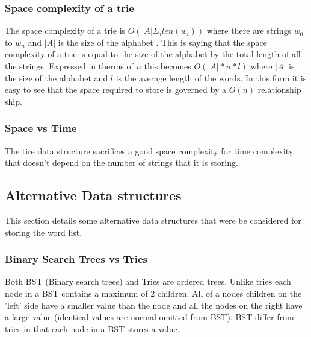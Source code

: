 \documentclass[10pt]{article} %
\begin{document}
			\subsubsection{Space complexity of a trie}
			    The space complexity of a trie is \begin{math} O(\vert A \vert \Sigma_i len(w_i))\end{math} where there are strings \begin{math} w_0 \end{math} to \begin{math} w_n \end{math} and \begin{math}\vert A \vert \end{math} is the size of the alphabet \cite{book:ADS:complexity}.
			    This is saying that the space complexity of a trie is equal to the size of the alphabet by the total length of all the strings.
			    Expressed in therms of \begin{math} n \end{math} this becomes \begin{math} O(\vert A \vert * n * l )\end{math} where \begin{math}\vert A \vert \end{math} is the size of the alphabet and \begin{math} l \end{math} is the average length of the words.
			    In this form it is easy to see that the space required to store is governed by a  \begin{math} O(n) \end{math} relationship ship.
			    
            \subsubsection{Space vs Time}
                The tire data structure sacrifices a good space complexity for time complexity that doesn't depend on the number of strings that it is storing. 
                
		\subsection{Alternative Data structures}
		    This section details some alternative data structures that were be considered for storing the word list.
		    
			\subsubsection{Binary Search Trees vs Tries}
			    Both BST (Binary search trees) and Tries are ordered trees.
			    Unlike tries each node in a BST contains a maximum of 2 children. All of a nodes children on the 'left' side have a smaller value than the node and all the nodes on the right have a large value (identical values are normal omitted from BST). BST differ from tries in that each node in a BST stores a value.
			    
\end{document}
